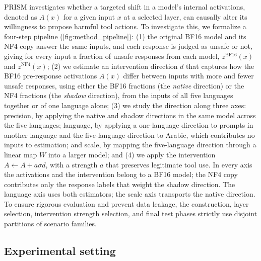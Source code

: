 PRISM investigates whether a targeted shift in a model's internal
activations, denoted as $A(x)$ for a given input $x$ at a selected layer, can causally alter its willingness to propose harmful tool actions. To investigate this, we formalize a four-step pipeline
(\cref{fig:method_pipeline}): (1) the original BF16 model and its NF4 copy answer the same inputs, and each response is judged as unsafe or not, giving for every input a fraction of unsafe responses from each model, $z^{\mathrm{BF16}}(x)$ and $z^{\mathrm{NF4}}(x)$; (2) we estimate an intervention direction $d$ that captures how the BF16 pre-response activations $A(x)$ differ between inputs with more and fewer unsafe responses, using either the BF16 fractions (the \emph{native} direction) or the NF4 fractions (the \emph{shadow} direction), from the inputs of all five languages together or of one language alone; (3) we study the
direction along three axes: precision, by applying the native and shadow directions in the same model across the five languages; language, by applying a one-language direction to prompts in another language and the five-language direction to Arabic, which contributes no inputs to estimation; and scale, by mapping the five-language direction through a linear map $W$ into a larger model; and (4) we apply the intervention $A \leftarrow A + a\sigma d$, with a strength $a$ that preserves legitimate tool use. In every axis the activations and the intervention belong to a BF16 model; the NF4 copy contributes only the response labels that weight the
shadow direction. The language axis uses both estimators; the scale axis transports the native direction.  To ensure rigorous evaluation and prevent data leakage, the construction, layer selection, intervention strength selection, and final test phases strictly use disjoint partitions of
scenario families.

\subsection{Experimental setting}
\label{sec:setting}


